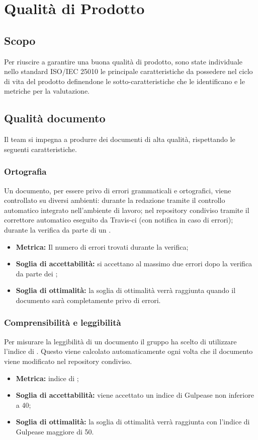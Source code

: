 \chapter{Qualità di Prodotto}
\label{prodotto}
\section{Scopo}
Per riuscire a garantire una buona qualità di prodotto, sono state individuale nello
standard ISO/IEC 25010 le principale caratteristiche da possedere nel ciclo di vita del prodotto definendone le sotto-caratteristiche che le identificano e le metriche per la valutazione.

\section{Qualità documento}
\label{documento}
Il team si impegna a produrre dei documenti di alta qualità, rispettando le seguenti caratteristiche.
\subsection{Ortografia}
Un documento, per essere privo di errori grammaticali e ortografici, viene controllato su diversi ambienti: durante la redazione tramite il controllo automatico integrato nell'ambiente di lavoro; nel repository condiviso tramite il correttore automatico eseguito da Travis-ci (con notifica in caso di errori); durante la verifica da parte di un .
\begin{itemize}
    \item \textbf{Metrica:} Il numero di errori trovati durante la verifica;
    \item \textbf{Soglia di accettabilità:} si accettano al massimo due errori dopo la verifica da parte dei ;
    \item \textbf{Soglia di ottimalità:} la soglia di ottimalità verrà raggiunta quando il documento sarà completamente privo di errori.
\end{itemize}
\subsection{Comprensibilità e leggibilità}
Per misurare la leggibilità di un documento il gruppo ha scelto di utilizzare l'indice di . Questo viene calcolato automaticamente ogni volta che il documento viene modificato nel repository condiviso.
\begin{itemize}
    \item \textbf{Metrica:} indice di ;
    \item \textbf{Soglia di accettabilità:} viene accettato un indice di Gulpease non inferiore a 40;
    \item \textbf{Soglia di ottimalità:} la soglia di ottimalità verrà raggiunta con l'indice di Gulpease maggiore di 50.
\end{itemize}
